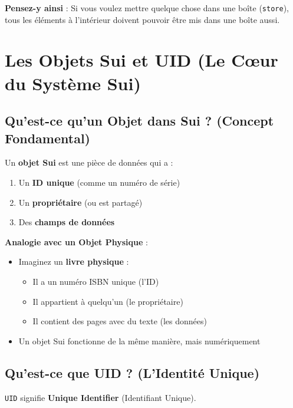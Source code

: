 \documentclass[11pt]{article}
\begin{document}
\begin{noteBox}
\textbf{Pensez-y ainsi} : Si vous voulez mettre quelque chose dans une boîte (\texttt{store}), tous les éléments à l'intérieur doivent pouvoir être mis dans une boîte aussi.
\end{noteBox}

\section{Les Objets Sui et UID (Le Cœur du Système Sui)}

\subsection{Qu'est-ce qu'un Objet dans Sui ? (Concept Fondamental)}

Un \textbf{objet Sui} est une pièce de données qui a :
\begin{enumerate}
  \item Un \textbf{ID unique} (comme un numéro de série)
  \item Un \textbf{propriétaire} (ou est partagé)
  \item Des \textbf{champs de données}
\end{enumerate}

\begin{explainBox}
\textbf{Analogie avec un Objet Physique} :
\begin{itemize}
  \item Imaginez un \textbf{livre physique} :
  \begin{itemize}
    \item Il a un numéro ISBN unique (l'ID)
    \item Il appartient à quelqu'un (le propriétaire)
    \item Il contient des pages avec du texte (les données)
  \end{itemize}
  \item Un objet Sui fonctionne de la même manière, mais numériquement
\end{itemize}
\end{explainBox}

\subsection{Qu'est-ce que UID ? (L'Identité Unique)}

\texttt{UID} signifie \textbf{Unique Identifier} (Identifiant Unique).
\end{document}

